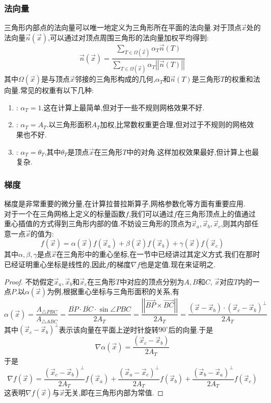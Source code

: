 \documentclass{ctexart}
\begin{document}
\subsubsection{法向量}
三角形内部点的法向量可以唯一地定义为三角形所在平面的法向量.对于顶点$\vec{x}$处的法向量$\vec{n}(\vec{x})$,可以通过对顶点周围三角形的法向量加权平均得到:
\[\vec{n}(\vec{x})=\dfrac{\displaystyle\sum_{T\in\Omega(\vec{x})}\alpha_T\vec{n}(T)}{\displaystyle\sum_{T\in\Omega(\vec{x})}\alpha_T\left|\left|\vec{n}(T)\right|\right|}\]
其中$\Omega(\vec{x})$是与顶点$\vec{x}$邻接的三角形构成的几何,$\alpha_T$和$\vec{n}(T)$是三角形$T$的权重和法向量.常见的权重有以下几种:
\begin{enumerate}[label=\tbf{\arabic*.},topsep=0pt,parsep=0pt,itemsep=0pt,partopsep=0pt]
    \item {}: $\alpha_T=1$.这在计算上最简单,但对于一些不规则网格效果不好.
    \item {}: $\alpha_T=A_T$.以三角形面积$A_T$加权,比常数权重更合理,但对过于不规则的网格效果也不好.
    \item {}: $\alpha_T=\theta_T$,其中$\theta_T$是顶点$\vec{x}$在三角形$T$中的对角.这样加权效果最好,但计算上也最复杂.
\end{enumerate}
\subsubsection{梯度}
梯度是非常重要的微分量,在计算拉普拉斯算子,网格参数化等方面有重要应用.\\
\indent 对于一个在三角网格上定义的标量函数$f$,我们可以通过$f$在三角形顶点上的值通过重心插值的方式得到三角形内部的值.不妨设三角形的顶点为$\vec{x}_a,\vec{x}_b,\vec{x}_c$,则其内部任意一点$\vec{x}$的值为:
\[f(\vec{x})=\alpha(\vec{x})f(\vec{x}_a)+\beta(\vec{x})f(\vec{x}_b)+\gamma(\vec{x})f(\vec{x}_c)\]
其中$\alpha,\beta,\gamma$是点$\vec{x}$在三角形中的重心坐标,在一节中已经讲过其定义方式.我们在那时已经证明重心坐标是线性的,因此$f$的梯度$\nabla f$也是定值.现在来证明之.
\begin{proof}
    不妨假定$\vec{x}_a,\vec{x}_b$和$\vec{x}_c$在三角形$T$中对应的顶点分别为$A,B$和$C$, $\vec{x}$对应$T$内的一点$P$.以$\alpha(\vec{x})$为例,根据重心坐标与三角形面积的关系,有
    \[\alpha(\vec{x})=\dfrac{A_{\triangle PBC}}{A_{\triangle ABC}}=\dfrac{\overline{BP}\cdot\overline{BC}\cdot\sin\angle PBC}{2A_T}=\dfrac{\left|\left|\overrightarrow{BP}\times\overrightarrow{BC}\right|\right|}{2A_T}=\dfrac{\left(\vec{x}-\vec{x}_b\right)\cdot\left(\vec{x}_c-\vec{x}_b\right)^{\bot}}{2A_T}\]
    其中$\left(\vec{x}_c-\vec{x}_b\right)^\bot$表示该向量在平面上逆时针旋转$90^\circ$后的向量.于是
    \[\nabla\alpha(\vec{x})=\dfrac{\left(\vec{x}_c-\vec{x}_b\right)}{2A_T}\]
    于是
    \[\nabla f(\vec{x})=\dfrac{\left(\vec{x}_c-\vec{x}_b\right)^\bot}{2A_T}f\left(\vec{x}_a\right)+\dfrac{\left(\vec{x}_a-\vec{x}_c\right)^\bot}{2A_T}f\left(\vec{x}_b\right)+\dfrac{\left(\vec{x}_b-\vec{x}_a\right)^\bot}{2A_T}f\left(\vec{x}_c\right)\]
    这表明$\nabla f(\vec{x})$与$\vec{x}$无关,即在三角形内部为常值.
\end{proof}
\end{document}
